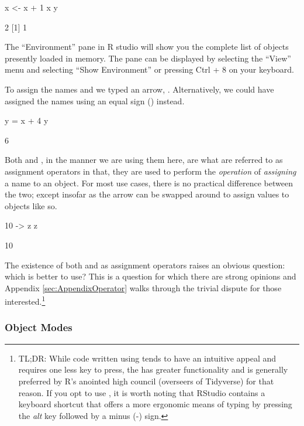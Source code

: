 \begin{inR}
x <- x + 1
x
y
\end{inR}

\begin{outR}
[1] 2
[1] 1
\end{outR}

The ``Environment'' pane in R studio will show you the complete list of objects presently loaded in memory. The pane can be displayed by selecting the ``View'' menu and selecting ``Show Environment'' or pressing Ctrl + 8 on your keyboard.

To assign the names  and  we typed an arrow, \R{<-}. Alternatively, we could have assigned the names using an equal sign (\R{=}) instead.

\begin{inR}
y = x + 4
y
\end{inR}

\begin{outR}
[1] 6
\end{outR}

Both \R{<-} and \R{=}, in the manner we are using them here, are what are referred to as \glspl{assignment operator} in that, they are used to perform the \textit{operation} of \textit{assigning} a name to an object. For most use cases, there is no practical difference between the two; except insofar as the arrow can be swapped around to assign values to objects like so.

\begin{inR}
10 -> z
z
\end{inR}

\begin{outR}
[1] 10
\end{outR}

The existence of both \R{=} and \R{<-} as assignment operators raises an obvious question: which is better to use?  This is a question for which there are strong opinions and Appendix \ref{sec:AppendixOperator} walks through the trivial dispute for those interested.\footnote{TL;DR: While code written using \R{=} tends to have an intuitive appeal and requires one less key to press, the \R{<-} has greater functionality and is generally preferred by R's anointed high council (overseers of Tidyverse) for that reason. If you opt to use \R{<-}, it is worth noting that RStudio contains a keyboard shortcut that offers a more ergonomic means of typing \R{<-} by pressing the \textit{alt} key followed by a minus (-) sign.}

\subsubsection{Object Modes}
\label{sec:modes}

